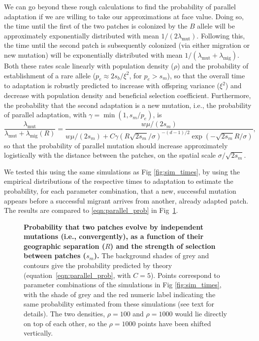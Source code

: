 \documentclass[10pt,letterpaper]{article}
\newcommand{\migrate}{\lambda_\text{mig}}
\newcommand{\mutrate}{\lambda_\text{mut}}
\begin{document}
We can go beyond these rough calculations to find
the probability of parallel adaptation if we are willing to take our approximations at face value. 
Doing so, the time until the first of the two patches is colonized by the $B$
allele will be approximately exponentially distributed with mean $1/(2
\mutrate)$.
Following this, the time until the second patch is subsequently colonized 
(via either migration or new mutation) 
will be exponentially distributed with mean $1/(\mutrate+\migrate)$.
Both these rates scale linearly with population density ($\rho$) 
and the probability of establishment of a rare allele ($p_e\approx 2 s_b/\xi^2$, for $p_e>s_m$),
so that the overall time to adaptation is robustly predicted to increase with offspring variance ($\xi^2$)
and decrease with population density and beneficial selection coefficient.
Furthermore, the probability that the second adaptation is a new mutation,
i.e., the probability of parallel adaptation, 
with $\gamma = \min(1,s_m/p_e)$,
is 
\begin{equation} \label{eqn:parallel_prob}
    \frac{\mutrate}{\mutrate+\migrate(R)} = \frac{ w \mu / (2s_m) }{ w \mu / (2s_m) + C \gamma \left(R \sqrt{2 s_m} /\sigma \right)^{-(d-1)/2}\exp\left(- \sqrt{2 s_m} R / \sigma \right) },  
\end{equation}
so that the probability of parallel mutation should increase
approximately logistically with the distance between the patches, on the spatial scale $\sigma/\sqrt{2 s_m}$.

We tested this using the same simulations as Fig \ref{fig:sim_times},
by using the empirical distributions of the respective times to adaptation
to estimate the probability,
for each parameter combination,
that a new, successful mutation appears 
before a successful migrant arrives from another, already adapted patch.
The results are compared to \eqref{eqn:parallel_prob}
in Fig~\ref{fig:sim_probs}.


\begin{figure}[ht!]
  \begin{center}
  \end{center}
  \caption{
      \textbf{Probability that two patches 
      evolve by independent mutations (i.e., convergently),
      as a function of their geographic separation ($R$)
      and the strength of selection between patches ($s_m$).}
      The background shades of grey and contours
      give the probability predicted by theory (equation~\eqref{eqn:parallel_prob}, with $C=5$).
      Points correspond to parameter combinations of the simulations in Fig \ref{fig:sim_times},
      with the shade of grey and the red numeric label indicating the same probability
      estimated from these simulations (see text for details).
      The two densities, $\rho=100$ and $\rho=1000$ would lie directly on top of each other, so the $\rho=1000$ points have been shifted vertically.
  }   \label{fig:sim_probs}
\end{figure}
\end{document}

